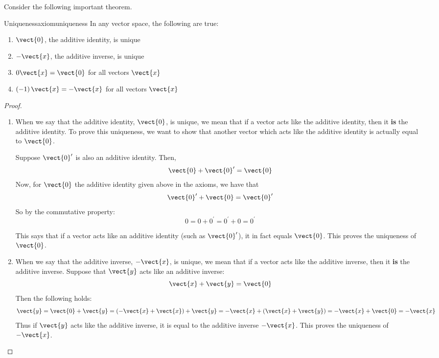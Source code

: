 Consider the following important theorem.

\begin{theorem}{Uniqueness}{axiomuniqueness}
In any vector space, the following are true:
\begin{enumerate}
\item
$\vect{0}$, the additive identity, is unique
\item
$-\vect{x}$, the additive inverse, is unique
\item
$0\vect{x}=\vect{0}$ for all vectors $\vect{x}$
\item
$\left( -1\right) \vect{x}=-\vect{x}$ for all vectors $\vect{x}$ 
\end{enumerate}
\end{theorem}

\begin{proof}
\begin{enumerate}
\item
When we say that the additive identity, $\vect{0}$, is unique, we mean that if a vector acts like the additive identity, then it \textbf{is} the additive identity. To prove this uniqueness, we want to show that another vector which acts like the additive identity is actually equal to $\vect{0}$. 

Suppose $\vect{0}^{\prime }$ is also an additive identity. Then,
\[
\vect{0} + \vect{0}^{\prime} = \vect{0}
\]
Now, for $\vect{0}$ the additive identity given above in the axioms, we have that 
\[
\vect{0}^{\prime} + \vect{0} = \vect{0}^{\prime}
\]
So by the commutative property:
\[
0 = 0 + 0^{\prime} = 0^{\prime} + 0 = 0^{\prime}
\]

This says that if a vector acts like an additive identity (such as $\vect{0}^{\prime}$), it in fact equals $\vect{0}$. This proves the uniqueness of $\vect{0}$.

\item
When we say that the additive inverse, $-\vect{x}$, is unique, we mean that if a vector acts like the additive inverse, then it \textbf{is} the additive inverse. 
Suppose that $\vect{y}$ acts like an additive inverse: 
\begin{equation*}
\vect{x}+\vect{y}=\vect{0}
\end{equation*}
Then the following holds:
\[
\vect{y} = \vect{0} + \vect{y} = (-\vect{x} + \vect{x}) + \vect{y} = -\vect{x} + (\vect{x} + \vect{y}) = -\vect{x} + \vect{0} = -\vect{x}
\]
Thus if $\vect{y}$ acts like the additive inverse, it is equal to the additive
inverse $-\vect{x}$. This proves the uniqueness of $-\vect{x}$. 


\end{enumerate}
\end{proof}
